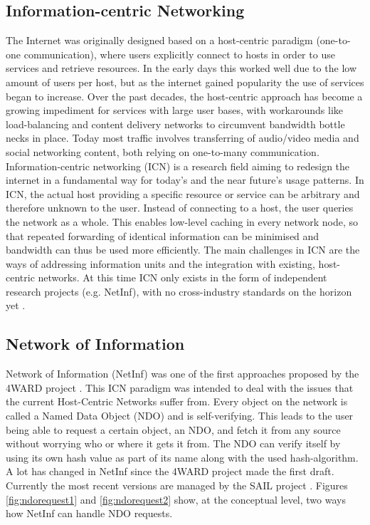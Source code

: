 \subsection{Information-centric Networking}
\label{sec:netinf}
The Internet was originally designed based on a host-centric paradigm 
(one-to-one communication), where users explicitly connect to hosts 
in order to use services and retrieve resources. In the early days 
this worked well due to the low amount of users per host, but as the 
internet gained popularity the use of services began to increase. 
Over the past decades, the host-centric approach has become a 
growing impediment for services with large user bases, with workarounds 
like load-balancing and content delivery networks to circumvent 
bandwidth bottle necks in place. Today most traffic involves 
transferring of audio/video media and social networking content,
 both relying on one-to-many communication. Information-centric
 networking (ICN) is a research field aiming to redesign the internet
 in a fundamental way for today's and the near future's usage patterns. 
In ICN, the actual host providing a specific resource or service can
 be arbitrary and therefore unknown to the user. Instead of connecting 
to a host, the user queries the network as a whole. This enables 
low-level caching in every network node, so that repeated forwarding 
of identical information can be minimised and bandwidth can thus be used more
 efficiently. The main challenges in ICN are the ways of addressing 
information units and the integration with existing, host-centric networks. 
At this time ICN only exists in the form of independent research projects 
(e.g. NetInf), with no cross-industry standards on the horizon
 yet \cite{ICNarticle}. 


\subsection{Network of Information}
Network of Information (NetInf) was one of the first approaches proposed 
by the 4WARD project \cite{4ward}. This ICN paradigm was intended to deal 
with the issues that the current Host-Centric Networks suffer from. Every 
object on the network is called a Named Data Object (NDO) and is self-verifying.
 This leads to the user being able to request a certain object, an NDO, 
and fetch it from any source without worrying who or where it gets it from.
 The NDO can verify itself by using its own hash value as part of its name
 along with the used hash-algorithm.
A lot has changed in NetInf since the 4WARD project made the first draft. 
Currently the most recent versions are managed by the SAIL project \cite{sail}. Figures \ref{fig:ndorequest1} and \ref{fig:ndorequest2} show, at the conceptual level, two ways how NetInf can handle NDO requests.

